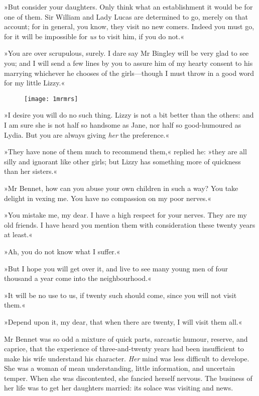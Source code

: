 »But consider your daughters. Only think what an establishment it would be for one of them. Sir William and Lady Lucas are determined to go, merely on that account; for in general, you know, they visit no new comers. Indeed you must go, for it will be impossible for \textit{us} to visit him, if you do not.«

»You are over scrupulous, surely. I dare say Mr Bingley will be very glad to see you; and I will send a few lines by you to assure him of my hearty consent to his marrying whichever he chooses of the girls—though I must throw in a good word for my little Lizzy.«

\begin{figure}[bh!]
\centering
\texttt{[image: 1mrmrs]}
\end{figure}

»I desire you will do no such thing. Lizzy is not a bit better than the others: and I am sure she is not half so handsome as Jane, nor half so good-humoured as Lydia. But you are always giving \textit{her} the preference.«

»They have none of them much to recommend them,« replied he: »they are all silly and ignorant like other girls; but Lizzy has something more of quickness than her sisters.«

»Mr Bennet, how can you abuse your own children in such a way? You take delight in vexing me. You have no compassion on my poor nerves.«

»You mistake me, my dear. I have a high respect for your nerves. They are my old friends. I have heard you mention them with consideration these twenty years at least.«

»Ah, you do not know what I suffer.«

»But I hope you will get over it, and live to see many young men of four thousand a year come into the neighbourhood.«

»It will be no use to us, if twenty such should come, since you will not visit them.«

»Depend upon it, my dear, that when there are twenty, I will visit them all.«

Mr Bennet was so odd a mixture of quick parts, sarcastic humour, reserve, and caprice, that the experience of three-and-twenty years had been insufficient to make his wife understand his character. \textit{Her} mind was less difficult to develope. She was a woman of mean understanding, little information, and uncertain temper. When she was discontented, she fancied herself nervous. The business of her life was to get her daughters married: its solace was visiting and news.

